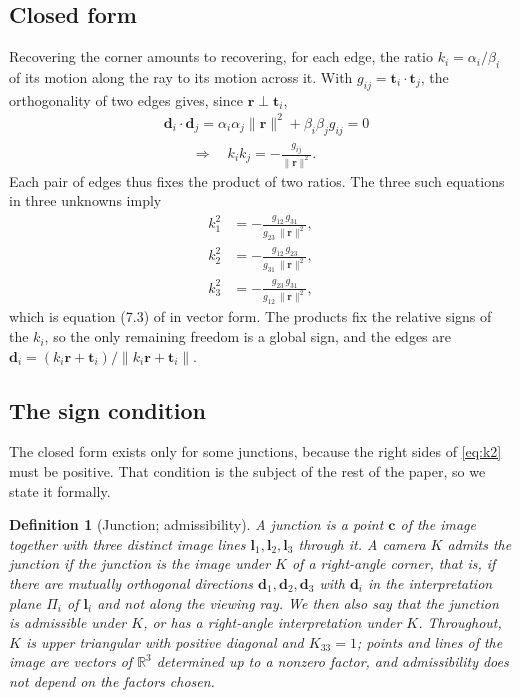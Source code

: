 \documentclass[pdflatex,sn-mathphys-num,iicol]{sn-jnl}
\newcommand{\vd}{\mathbf{d}}
\newcommand{\vr}{\mathbf{r}}
\newcommand{\vt}{\mathbf{t}}
\newcommand{\vl}{\mathbf{l}}
\newcommand{\vc}{\mathbf{c}}
\theoremstyle{thmstyleone}
\theoremstyle{thmstylethree}
\newtheorem{definition}[theorem]{Definition}
\theoremstyle{thmstyletwo}
\begin{document}
\subsection{Closed form}\label{sec:closed}

Recovering the corner amounts to recovering, for each edge, the ratio $k_i=\alpha_i/\beta_i$ of its motion along the ray to its motion across it. With $g_{ij}=\vt_i\cdot\vt_j$, the orthogonality of two edges gives, since $\vr\perp\vt_i$,
\begin{equation}
\begin{aligned}
&\vd_i\cdot\vd_j=\alpha_i\alpha_j\|\vr\|^2+\beta_i\beta_j g_{ij}=0\\
&\qquad\Longrightarrow\quad k_ik_j=-\frac{g_{ij}}{\|\vr\|^2}.
\end{aligned}
\label{eq:kk}
\end{equation}
Each pair of edges thus fixes the product of two ratios. The three such equations in three unknowns imply
\begin{equation}
\begin{aligned}
k_1^2&=-\frac{g_{12}\,g_{31}}{g_{23}\,\|\vr\|^2},\\
k_2^2&=-\frac{g_{12}\,g_{23}}{g_{31}\,\|\vr\|^2},\\
k_3^2&=-\frac{g_{23}\,g_{31}}{g_{12}\,\|\vr\|^2},
\end{aligned}
\label{eq:k2}
\end{equation}
which is equation (7.3) of \citet{kanatani1988} in vector form. The products fix the relative signs of the $k_i$, so the only remaining freedom is a global sign, and the edges are  $\vd_i=(k_i\vr+\vt_i)/\|k_i\vr+\vt_i\|$.

\subsection{The sign condition}\label{sec:sign}

The closed form exists only for some junctions, because the right sides of \eqref{eq:k2} must be positive. That condition is the subject of the rest of the paper, so we state it formally.

\begin{definition}[Junction; admissibility]\label{def:admissible}
A \emph{junction} is a point $\vc$ of the image together with three distinct image lines $\vl_1,\vl_2,\vl_3$ through it. A camera $K$ \emph{admits} the junction if the junction is the image under $K$ of a right-angle corner, that is, if there are mutually orthogonal directions $\vd_1,\vd_2,\vd_3$ with $\vd_i$ in the interpretation plane $\Pi_i$ of $\vl_i$ and not along the viewing ray. We then also say that the junction is \emph{admissible} under $K$, or has a \emph{right-angle interpretation} under $K$. Throughout, $K$ is upper triangular with positive diagonal and $K_{33}=1$; points and lines of the image are vectors of $\mathbb R^3$ determined up to a nonzero factor, and admissibility does not depend on the factors chosen.
\end{definition}
\end{document}
